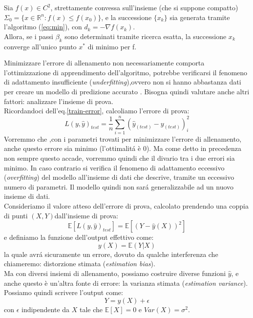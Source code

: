 \documentclass[a4paper,12pt]{report}
\begin{document}
\begin{teo}
Sia $f(x)\in C^{2}$, strettamente convessa sull'insieme (che si suppone compatto) $\Sigma_{0}=\{x\in\mathbb{R}^{n}:f(x)\leq f(x_{0})\}$, e la successione $\{x_{k}\}$ sia generata tramite l'algoritmo (\ref{eq:min}), con $d_{k}=-\nabla f(x_{k})$.\\
Allora, se i passi $\beta_{k}$ sono determinati tramite ricerca esatta, la successione $x_{k}$ converge all'unico punto $x^{*}$ di minimo per f.
\end{teo}
Minimizzare l'errore di allenamento non necessariamente comporta l'ottimizzazione di apprendimento dell'algoritmo, potrebbe verificarsi il fenomeno di adattamento insufficiente (\textit{underfitting}),ovvero non si hanno abbastanza dati per creare un modello di predizione accurato . Bisogna quindi valutare anche altri fattori: analizzare l'insieme di prova.\\
Ricordandoci dell'eq.\ref{train-error}, calcoliamo l'errore di prova:
\begin{equation}\label{test-error}
L(y,\hat{y})_{test}=\frac{1}{n}\sum_{i=1}^{n}(\hat{y}_{(test)}-y_{(test)})_{i}^2
\end{equation}
Vorremmo che ,con i parametri trovati per minimizzare l'errore di allenamento, anche questo errore sia minimo (l'ottimalit\'{a} \`e 0). Ma come detto in precedenza non sempre questo accade, vorremmo quindi che il divario tra i due errori sia minimo. In caso contrario si verifica il fenomeno di adattamento eccessivo (\textit{overfitting}) del modello all'insieme di dati che descrive, tramite un eccessivo numero di parametri. Il modello quindi non sar\'{a} generalizzabile ad un nuovo insieme di dati.\\
Consideriamo il valore atteso dell'errore di prova, calcolato prendendo una coppia di punti $(X,Y)$dall'insieme di prova:
\begin{equation}\label{test}
\mathbb{E} [L(y,\hat{y})_{test}]=\mathbb{E} [(Y-\hat{y}(X))^{2}]
\end{equation}
e definiamo la funzione dell'output effettivo come:
$$y(X)=\mathbb{E}(Y|X)$$
la quale avr\'{a} sicuramente un errore, dovuto da qualche interferenza che chiameremo: distorzione stimata (\textit{estimation bias}).\\
Ma con diversi insiemi di allenamento, possiamo costruire diverse funzioni $\hat{y}$, e anche questo \`e un'altra fonte di errore: la varianza stimata (\textit{estimation variance}). Possiamo quindi scrivere l'output come:
$$Y=y(X)+\epsilon$$ con $\epsilon$ indipendente da $X$ tale che $\mathbb{E}[X]=0$ e $Var(X)=\sigma^{2}$.\\
\end{document}
